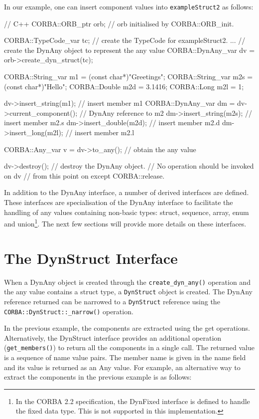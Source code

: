 \documentclass[11pt,twoside,a4paper]{book}
\newcommand{\type}[1]{\texttt{#1}}
\newcommand{\op}[1]{\texttt{#1()}}
\begin{document}
In our example, one can insert component values into
\type{exampleStruct2} as follows:

\begin{cxxlisting}
// C++
CORBA::ORB_ptr orb;  // orb initialised by CORBA::ORB_init.
  
CORBA::TypeCode_var tc;
// create the TypeCode for exampleStruct2.
...
// create the DynAny object to represent the any value
CORBA::DynAny_var dv = orb->create_dyn_struct(tc);
  
CORBA::String_var m1  = (const char*)"Greetings";
CORBA::String_var m2s = (const char*)"Hello";
CORBA::Double     m2d = 3.1416;
CORBA::Long       m2l = 1;
  
dv->insert_string(m1);   // insert member m1
CORBA::DynAny_var dm = dv->current_component(); // DynAny reference to m2
dm->insert_string(m2s);  // insert member m2.s
dm->insert_double(m2d);  // insert member m2.d
dm->insert_long(m2l);    // insert member m2.l
  
CORBA::Any_var v = dv->to_any();  // obtain the any value
  
dv->destroy();          // destroy the DynAny object.
                        // No operation should be invoked on dv
                        // from this point on except CORBA::release.
\end{cxxlisting}


In addition to the DynAny interface, a number of derived interfaces
are defined. These interfaces are specialisation of the DynAny
interface to facilitate the handling of any values containing
non-basic types: struct, sequence, array, enum and union\footnote{In
the CORBA 2.2 specification, the DynFixed interface is defined to
handle the fixed data type. This is not supported in this
implementation.}. The next few sections will provide more details on
these interfaces.

\section{The DynStruct Interface}

When a DynAny object is created through the \op{create\_dyn\_any}
operation and the any value contains a struct type, a \type{DynStruct}
object is created. The DynAny reference returned can be narrowed to a
\type{DynStruct} reference using the \op{CORBA::DynStruct::\_narrow}
operation.

In the previous example, the components are extracted using the get
operations. Alternatively, the DynStruct interface provides an
additional operation (\op{get\_members}) to return all the components
in a single call. The returned value is a sequence of name value
pairs. The member name is given in the name field and its value is
returned as an Any value.  For example, an alternative way to extract
the components in the previous example is as follows:
\end{document}
